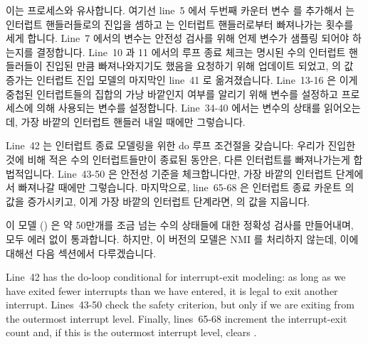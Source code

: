 이는  프로세스와 유사합니다.
여기선 line~5 에서 두번째 카운터 변수  를 추가해서  는 인터럽트
핸들러들로의 진입을 셈하고  는 인터럽트 핸들러로부터 빠져나가는 횟수를
세게 합니다.
Line~7 에서의  변수는 안전성 검사를 위해 언제 
변수가 샘플링 되어야 하는지를 결정합니다.
Line~10 과 11 에서의 루프 종료 체크는 명시된 수의 인터럽트 핸들러들이 진입된
만큼 빠져나와지기도 했음을 요청하기 위해 업데이트 되었고,  의 값 증가는
인터럽트 진입 모델의 마지막인 line~41 로 옮겨졌습니다.
Line~13-16 은 이게 중첩된 인터럽트들의 집합의 가낭 바깥인지 여부를 알리기 위해
 변수를 설정하고  프로세스에 의해 사용되는
 변수를 설정합니다.
Line~34-40 에서는  변수의 상태를 읽어오는데, 가장 바깥의 인터럽트
핸들러 내일 때에만 그렇습니다.
\iffalse

This is similar to the earlier \co{dynticks_irq()} process.
It adds a second counter variable \co{j} on line~5, so that
\co{i} counts entries to interrupt handlers and \co{j}
counts exits.
The \co{outermost} variable on line~7 helps determine
when the \co{gp_state} variable needs to be sampled
for the safety checks.
The loop-exit check on lines~10 and~11 is updated to require that the
specified number of interrupt handlers are exited as well as entered,
and the increment of \co{i} is moved to line~41, which is
the end of the interrupt-entry model.
Lines~13-16 set the \co{outermost} variable to indicate
whether this is the outermost of a set of nested interrupts and to
set the \co{in_dyntick_irq} variable that is used by the
\co{dyntick_nohz()} process.
Lines~34-40 capture the state of the \co{gp_state}
variable, but only when in the outermost interrupt handler.
\fi

Line~42 는 인터럽트 종료 모델링을 위한 do 루프 조건절을 갖습니다:
우리가 진입한 것에 비해 적은 수의 인터럽트들만이 종료된 동안은, 다른 인터럽트를
빠져나가는게 합법적입니다.
Line~43-50 은 안전성 기준을 체크합니다만, 가장 바깥의 인터럽트 단계에서
빠져나갈 때에만 그렇습니다.
마지막으로, line~65-68 은 인터럽트 종료 카운트  의 값을 증가시키고, 이게
가장 바깥의 인터럽트 단계라면,  의 값을 지웁니다.

이 모델 ()
은 약 50만개를 조금 넘는 수의 상태들에 대한 정확성 검사를 만들어내며, 모두 에러
없이 통과합니다.
하지만, 이 버전의 모델은 NMI 를 처리하지 않는데, 이에 대해선 다음 섹션에서
다루겠습니다.
\iffalse

Line~42 has the do-loop conditional for interrupt-exit modeling:
as long as we have exited fewer interrupts than we have entered, it is
legal to exit another interrupt.
Lines~43-50 check the safety criterion, but only if we are exiting
from the outermost interrupt level.
Finally, lines~65-68 increment the interrupt-exit count 
and, if this is the outermost interrupt level, clears
.

